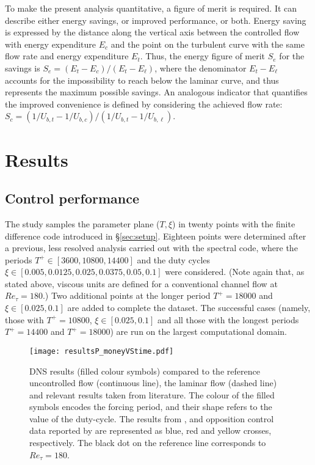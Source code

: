 \documentclass[lineno]{jfm}
\begin{document}
To make the present analysis quantitative, a figure of merit is required. It can describe either energy savings, or improved performance, or both. 
Energy saving is expressed by the distance along the vertical axis between the controlled flow with energy expenditure $E_c$ and the point on the turbulent curve with the same flow rate and energy expenditure $E_t$. 
Thus, the energy figure of merit $S_e$ for the savings is $S_e = (E_t-E_c) / (E_t-E_\ell)$, where the denominator $E_t-E_\ell$ accounts for the impossibility to reach below the laminar curve, and thus represents the maximum possible savings. 
An analogous indicator that quantifies the improved convenience is defined by 
considering the achieved flow rate: 
$S_c= (1/U_{b,t} - 1/U_{b,c}) / (1/U_{b,t} - 1/U_{b,\ell})$. 

\section{Results}
\label{sec:results}

\subsection{Control performance}
\label{sec:performance}

The study samples the parameter plane ($T,\xi$) in twenty points with the finite difference code introduced in \S\ref{sec:setup}.
Eighteen points were determined after a previous, less resolved analysis \citep{monti-2015} carried out with the spectral code, where the periods $T^+\in[3600,10800,14400]$ and the duty cycles $\xi\in[0.005,0.0125,0.025,0.0375,0.05,0.1]$ were considered.
(Note again that, as stated above, viscous units are defined for a conventional channel flow at $Re_\tau=180$.)
Two additional points at the longer period $T^+=18000$ and $\xi\in[0.025,0.1]$ are added to complete the dataset.
The successful cases (namely, those with $T^+=10800$, $\xi\in[0.025,0.1]$ and all those with the longest periods $T^+=14400$ and $T^+=18000$) are run on the largest computational domain.

\begin{figure}
\centering
\texttt{[image: resultsP\_moneyVStime.pdf]}
\caption{DNS results (filled colour symbols) compared to the reference uncontrolled flow (continuous line), the laminar flow (dashed line) and relevant results taken from literature. 
The colour of the filled symbols encodes the forcing period, and their shape refers to the value of the duty-cycle. The results from \citet{iwamoto-sasou-kawamura-2007}, \citet{kobayashi-etal-2021} and opposition control data reported by \citet{frohnapfel-hasegawa-quadrio-2012} are represented as blue, red and yellow crosses, respectively. The black dot on the reference line corresponds to $Re_\tau=180$.} 
\label{fig:resMvsT}
\end{figure}
\end{document}
